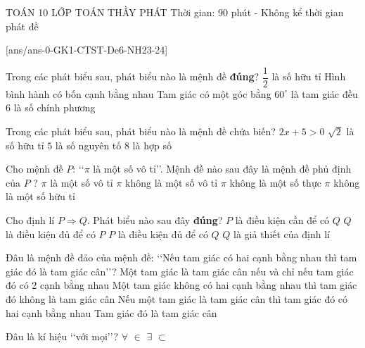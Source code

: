 \begin{name}
	{\tenchude}
	{TOÁN 10}
	{LỚP TOÁN THẦY PHÁT}
	{Thời gian: 90 phút - Không kể thời gian phát đề}
\end{name}
[ans/ans-0-GK1-CTST-De6-NH23-24]
\begin{ex}%
Trong các phát biểu sau, phát biểu nào là mệnh đề \textbf{đúng}?
\choice
{\True $\dfrac{1}{2}$ là số hữu tỉ}
{Hình bình hành có bốn cạnh bằng nhau}
{Tam giác có một góc bằng $60^{\circ}$ là tam giác đều}
{$6$ là số chính phương}
	\loigiai{
	}
\end{ex}

\begin{ex}%
	Trong các phát biểu sau, phát biểu nào là mệnh đề chứa biến?
	\choice
	{\True $2x+5>0$}
	{$\sqrt{2}$ là số hữu tỉ}
	{$5$ là số nguyên tố}
	{$8$ là hợp số}
\end{ex}

\begin{ex}%
Cho mệnh đề $P$: \lq\lq$\pi$ là một số vô tỉ\rq\rq. Mệnh đề nào sau đây là mệnh đề phủ định của $P$ ?
\choice
{$\pi$ là một số vô tỉ}
{\True $\pi$ không là một số vô tỉ}
{$\pi$ không là một số thực}
{$\pi$ không là một số hữu tỉ}
	\loigiai{
	}
\end{ex}

\begin{ex}%
Cho định lí $P \Rightarrow Q$. Phát biểu nào sau đây \textbf{đúng}?
	\choice
{$P$ là điều kiện cần để có $Q$}
{$Q$ là điều kiện đủ để có $P$}
{\True $P$ là điều kiện đủ để có $Q$}
{$Q$ là giả thiết của định lí}
	\loigiai{
	}
\end{ex}

\begin{ex}%
Đâu là mệnh đề đảo của mệnh đề: \lq\lq Nếu tam giác có hai cạnh bằng nhau thì tam giác đó là tam giác cân\rq\rq ?
\choice
{Một tam giác là tam giác cân nếu và chỉ nếu tam giác đó có 2 cạnh bằng nhau}
{Một tam giác không có hai cạnh bằng nhau thì tam giác đó không là tam giác cân}
{\True Nếu một tam giác là tam giác cân thì tam giác đó có hai cạnh bằng nhau}
{Tam giác đó là tam giác cân}
	\loigiai{
	}
\end{ex}

\begin{ex}%
Đâu là kí hiệu \lq\lq với mọi\rq\rq ?
	\choice
	{\True $\forall$}
	{$\in$}
	{$\exists$}
	{$\subset$}
	\loigiai{
	}
\end{ex}

